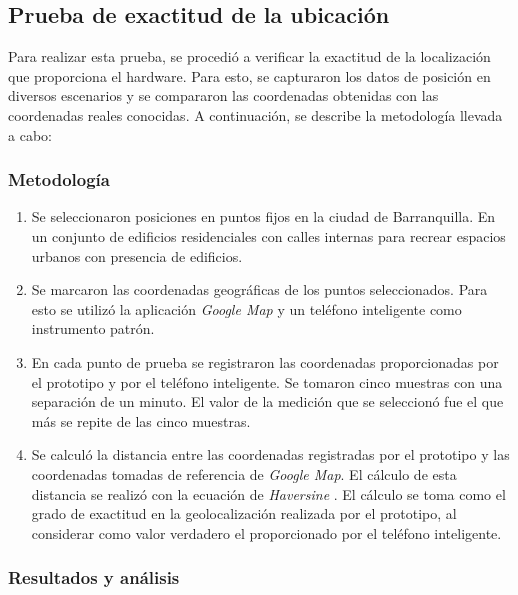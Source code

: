 \subsection{Prueba de exactitud de la ubicación}

Para realizar esta prueba, se procedió a verificar la exactitud de la localización que proporciona el hardware. Para esto, se capturaron los datos de posición en diversos escenarios y se compararon las coordenadas obtenidas con las coordenadas reales conocidas. A continuación, se describe la metodología llevada a cabo:

\subsubsection{Metodología}

\begin{enumerate}
\item Se seleccionaron posiciones en puntos fijos en la ciudad de Barranquilla. En un conjunto de edificios residenciales con calles internas para recrear espacios urbanos con presencia de edificios. 

\item Se marcaron las coordenadas geográficas de los puntos seleccionados. Para esto se utilizó la aplicación \textit{Google Map} y un teléfono inteligente como instrumento patrón. 

\item En cada punto de prueba se registraron las coordenadas proporcionadas por el prototipo y por el teléfono inteligente. Se tomaron cinco muestras con una separación de un minuto. El valor de la medición que se seleccionó fue el que más se repite de las cinco muestras. 

\item Se calculó la distancia entre las coordenadas registradas por el prototipo y las coordenadas tomadas de referencia de \textit{Google Map}. El cálculo de esta distancia se realizó con la ecuación de \textit{Haversine} \citep{Alkan-Celebi}. El cálculo se toma como el grado de exactitud en la geolocalización realizada por el prototipo, al considerar como valor verdadero el proporcionado por el teléfono inteligente.

\end{enumerate}


\subsubsection{Resultados y análisis}


